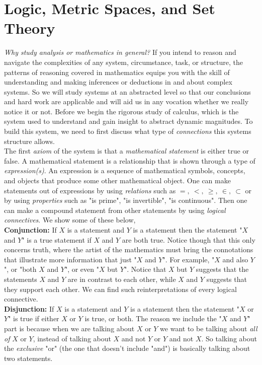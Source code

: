 \documentclass[../main.tex]{subfiles}
\begin{document}
\section{Logic, Metric Spaces, and Set Theory}




\indent \textit{Why study analysis or mathematics in general?} If you intend to reason and navigate the complexities of any system, circumstance, task, or structure, the patterns of reasoning covered in mathematics equips you with the skill of understanding and making inferences or deductions in and about complex systems. So we will study systems at an abstracted level so that our conclusions and hard work are applicable and will aid us in any vocation whether we really notice it or not.  
\indent Before we begin the rigorous study of calculus, which is the system used to understand and gain insight to abstract dynamic magnitudes. To build this system, we need to first discuss what type of \textit{connections} this systems structure allows. \\
\indent The first \textit{axiom} of the system is that a \textit{mathematical statement} is either true or false. A mathematical statement is a relationship that is shown through a type of \textit{expression(s)}. An expression is a sequence of mathematical symbols, concepts, and objects that produce some other mathematical object. One can make statements out of expressions by using \textit{relations} such as  \(=, \ <, \ \geq, \ \in, \ \subset \) or by using \textit{properties} such as "is prime", "is invertible", "is continuous". Then one can make a compound statement from other statements by using \textit{logical connectives}. We show some of these below, \\
\textbf{Conjunction:} If \(X\) is a statement and $Y$ is a statement then the statement "$X$ and $Y$" is a true statement if $X$ and $Y$ are both true. Notice though that this only concerns truth, where the artist of the mathematics must bring the connotations that illustrate more information that just "$X$ and $Y$". For example, "$X$ and also $Y$", or "both $X$ and $Y$", or even "$X$ but $Y$". Notice that $X$ but $Y$ suggests that the statements $X$ and $Y$ are in contrast to each other, while $X$ and $Y$ suggests that they support each other. We can find such reinterpretations of every logical connective.\\
\textbf{Disjunction:} If $X$ is a statement and $Y$ is a statement then the statement "$X$ or $Y$" is true if either $X$ or $Y$ is true, or both. The reason we include the "$X$ and $Y$" part is because when we are talking about $X$ or $Y$ we want to be talking about \textit{all of} $X$ or $Y$, instead of talking about $X$ and not $Y$ or $Y$ and not $X$. So talking about the \textit{exclusive} "or" (the one that doesn't include "and") is basically talking about two statements. \\
\end{document}
